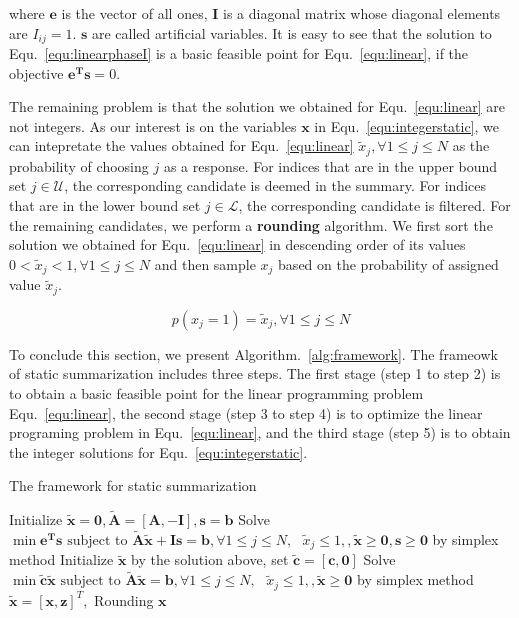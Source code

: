 \documentclass{llncs}
\begin{document}
where $\mathbf{e}$ is the vector of all ones, $\mathbf{I}$ is a diagonal matrix whose diagonal elements are $I_{ij}=1$. $\mathbf{s}$ are called artificial variables. It is easy to see that the solution to Equ.~\ref{equ:linearphaseI} is a basic feasible point for Equ.~\ref{equ:linear}, if the objective $\mathbf{e^{T}s}=0 $.

The remaining problem is that the solution we obtained for Equ.~\ref{equ:linear} are not integers. As our interest is on the variables $\mathbf{x}$ in Equ.~\ref{equ:integerstatic}, we can intepretate the values obtained for Equ.~\ref{equ:linear} $\tilde{x}_j, \forall 1\leq j\leq N $ as the probability of choosing $j$ as a response. For indices that are in the upper bound set $j \in \mathcal{U}$, the corresponding candidate is deemed in the summary. For indices that are in the lower bound set $j \in \mathcal{L}$, the corresponding candidate is filtered. For the remaining candidates, we perform a \textbf{rounding} algorithm. We first sort the solution we obtained for Equ.~\ref{equ:linear} in descending order of its values $0< \tilde{x}_j< 1,\forall 1\leq j\leq N$ and then sample $x_j$ based on the probability of assigned value $\tilde{x}_j$. 

\begin{equation}
p(x_j=1)= \tilde{x}_j, \forall 1\leq j \leq N
\end{equation}



To conclude this section, we present Algorithm.~\ref{alg:framework}. The frameowk of static summarization includes three steps. The first stage (step 1 to step 2) is to obtain a basic feasible point for the linear programming problem Equ.~\ref{equ:linear}, the second stage (step 3 to step 4) is to optimize the linear programing problem in Equ.~\ref{equ:linear}, and the third stage (step 5) is to obtain the integer solutions for Equ.~\ref{equ:integerstatic}.   

\begin{algorithm}\label{alg:framework}
\caption{The framework for static summarization}

Initialize $\tilde{\mathbf{x}}=\mathbf{0},\tilde{\mathbf{A}}=[\mathbf{A},-\mathbf{I}],\mathbf{s}=\mathbf{b}$\;
Solve $\min \mathbf{e^{T}s} \textrm{ subject to } \tilde{\mathbf{A}}\tilde{\mathbf{x}} + \mathbf{Is} = \mathbf{b},  \forall 1\leq j\leq N,\textrm{ } \tilde{x}_j \leq 1, ,\tilde{\mathbf{x}}\geq \mathbf{0}, \mathbf{s}\geq \mathbf{0}$ by simplex method\;
Initialize $\tilde{\mathbf{x}}$ by the solution above, set $\tilde{\mathbf{c}}=[\mathbf{c},\mathbf{0}]$  \;
Solve $\min \tilde{\mathbf{c}}\tilde{\mathbf{x}}\textrm{ subject to } \tilde{\mathbf{A}}\tilde{\mathbf{x}} = \mathbf{b}, \forall 1\leq j\leq N,\textrm{ } \tilde{x}_j \leq 1, ,\tilde{\mathbf{x}}\geq \mathbf{0}$ by simplex method\;
$\tilde{\mathbf{x}}=[\mathbf{x},\mathbf{z}]^T,$ Rounding $\mathbf{x}$\;
\end{algorithm}
\end{document}
